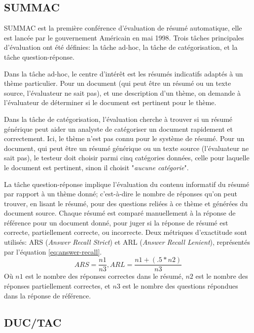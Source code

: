 \documentclass[a4paper,12pt,oneside]{../use/ESIthesis}
\begin{document}
\subsection{SUMMAC}

SUMMAC est la première conférence d'évaluation de résumé automatique\cite{99-mani-al}, elle est lancée par le gouvernement Américain en mai 1998. 
Trois tâches principales d'évaluation ont été définies: la tâche ad-hoc, la tâche de catégorisation, et la tâche question-réponse. 

Dans la tâche ad-hoc, le centre d'intérêt est les résumés indicatifs adaptés à un thème particulier. 
Pour un document (qui peut être un résumé ou un texte source, l'évaluateur ne sait pas), et une description d'un thème, on demande à l'évaluateur de déterminer si le document est pertinent pour le thème. 

Dans la tâche de catégorisation, l'évaluation cherche à trouver si un résumé générique peut aider un analyste de catégoriser un document rapidement et correctement. 
Ici, le thème n'est pas connu pour le système de résumé. 
Pour un document, qui peut être un résumé générique ou un texte source (l'évaluateur ne sait pas), le testeur doit choisir parmi cinq catégories données, celle pour laquelle le document est pertinent, sinon il choisit "\textit{aucune catégorie}". 

La tâche question-réponse implique l'évaluation du contenu informatif du résumé par rapport à un thème donné; c'est-à-dire le nombre de réponses qu'on peut trouver, en lisant le résumé, pour des questions reliées à ce thème et générées du document source. 
Chaque résumé est comparé manuellement à la réponse de référence pour un document donné, pour juger si la réponse de résumé est correcte, partiellement correcte, ou incorrecte.
Deux métriques d'exactitude sont utilisés: ARS (\textit{Answer Recall Strict}) et ARL (\textit{Answer Recall Lenient}), représentés par l'équation \ref{eq:answer-recall}.
\begin{equation}
\label{eq:answer-recall}
ARS = \frac{n1}{n3}, 
ARL = \frac{n1 + (.5 * n2)}{n3}
\end{equation}
Où $ n1 $ est le nombre des réponses correctes dans le résumé, $ n2 $ est le nombre des réponses partiellement correctes, et $ n3 $ est le nombre des questions répondues dans la réponse de référence.

\subsection{DUC/TAC}
\end{document}
